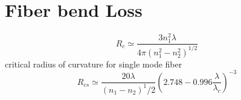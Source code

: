 \documentclass[12pt, onecolumn]{article}
\begin{document}
\section{Fiber bend Loss}
    \begin{equation}
        R_c \simeq \displaystyle\frac{3n_1^2\lambda}{4\pi(n_1^2-n_2^2)^{1/2}}
        \label{eq:crit_radius}
    \end{equation}
    critical radius of curvature for single mode fiber
    \begin{equation}
        R_{cs} \simeq \displaystyle\frac{20\lambda}{(n_1 - n_2)^1/2} \left( 2.748 - 0.996 \displaystyle\frac{\lambda}{\lambda_c} \right)^{-3}
        \label{eq:crit_single_radius}
    \end{equation}
\end{document}
